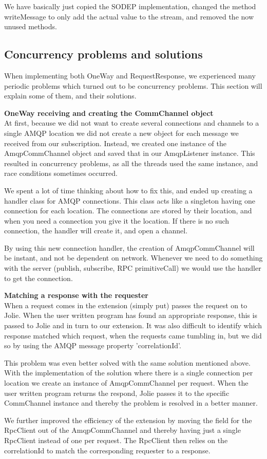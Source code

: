 We have basically just copied the SODEP implementation, changed the method writeMessage to only add the actual value to the stream, and removed the now unused methods.

\subsection{Concurrency problems and solutions}
When implementing both OneWay and RequestResponse, we experienced many periodic problems which turned out to be concurrency problems. This section will explain some of them, and their solutions.

\noindent\textbf{OneWay receiving and creating the CommChannel object}\\
At first, because we did not want to create several connections and channels to a single AMQP location we did not create a new object for each message we received from our subscription. Instead, we created one instance of the AmqpCommChannel object and saved that in our AmqpListener instance. This resulted in concurrency problems, as all the threads used the same instance, and race conditions sometimes occurred.

We spent a lot of time thinking about how to fix this, and ended up creating a handler class for AMQP connections. This class acts like a singleton having one connection for each location. The connections are stored by their location, and when you need a connection you give it the location. If there is no such connection, the handler will create it, and open a channel.

By using this new connection handler, the creation of AmqpCommChannel will be instant, and not be dependent on network. Whenever we need to do something with the server (publish, subscribe, RPC primitiveCall) we would use the handler to get the connection.

\noindent\textbf{Matching a response with the requester}\\
When a request comes in the extension (simply put) passes the request on to Jolie. When the user written program has found an appropriate response, this is passed to Jolie and in turn to our extension. It was also difficult to identify which response matched which request, when the requests came tumbling in, but we did so by using the AMQP message property 'correlationId'.

This problem was even better solved with the same solution mentioned above. With the implementation of the solution where there is a single connection per location we create an instance of AmqpCommChannel per request. When the user written program returns the respond, Jolie passes it to the specific CommChannel instance and thereby the problem is resolved in a better manner.

We further improved the efficiency of the extension by moving the field for the RpcClient out of the AmqpCommChannel and thereby having just a single RpcClient instead of one per request. The RpcClient then relies on the correlationId to match the corresponding requester to a response.
\newpage